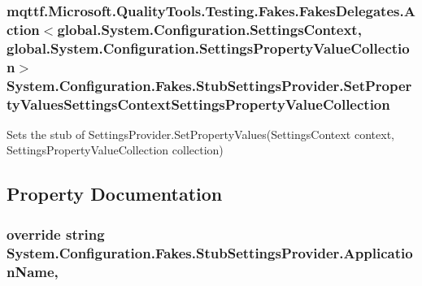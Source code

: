\hypertarget{class_system_1_1_configuration_1_1_fakes_1_1_stub_settings_provider_a015dfe1ce1d385dda9f8d9d9ea202417}{
\subsubsection[{Set\-Property\-Values\-Settings\-Context\-Settings\-Property\-Value\-Collection}]{\setlength{\rightskip}{0pt plus 5cm}mqttf.\-Microsoft.\-Quality\-Tools.\-Testing.\-Fakes.\-Fakes\-Delegates.\-Action$<$global.\-System.\-Configuration.\-Settings\-Context, global.\-System.\-Configuration.\-Settings\-Property\-Value\-Collection$>$ System.\-Configuration.\-Fakes.\-Stub\-Settings\-Provider.\-Set\-Property\-Values\-Settings\-Context\-Settings\-Property\-Value\-Collection}}\label{class_system_1_1_configuration_1_1_fakes_1_1_stub_settings_provider_a015dfe1ce1d385dda9f8d9d9ea202417}


Sets the stub of Settings\-Provider.\-Set\-Property\-Values(\-Settings\-Context context, Settings\-Property\-Value\-Collection collection)



\subsection{Property Documentation}
\hypertarget{class_system_1_1_configuration_1_1_fakes_1_1_stub_settings_provider_a842009c70b4db6995e7a1bd80a41f8ef}{
\subsubsection[{Application\-Name}]{\setlength{\rightskip}{0pt plus 5cm}override string System.\-Configuration.\-Fakes.\-Stub\-Settings\-Provider.\-Application\-Name\hspace{0.3cm}{\ttfamily [get]}, {\ttfamily [set]}}}\label{class_system_1_1_configuration_1_1_fakes_1_1_stub_settings_provider_a842009c70b4db6995e7a1bd80a41f8ef}


